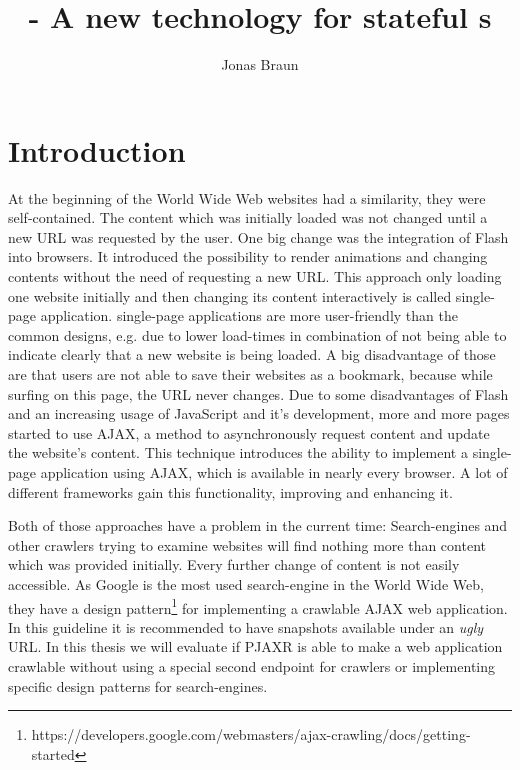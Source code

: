 \documentclass[f,bachelor,binding,twoside,palatino]{WeSTthesis}
\author{Jonas Braun}
\title{\pjaxr{} - A new technology for stateful \singlePageApplication{}s}
\def \ajax {AJAX}
\def \pjaxr {PJAXR}
\def \singlePageApplication {single-page application}
\begin{document}

\maketitle %

\tableofcontents

\varclearpage



\addtocounter{footnote}

\section{Introduction}
    At the beginning of the World Wide Web websites had a similarity, they were self-contained. The content which was initially loaded was not changed until a new URL was requested by the user.
    One big change was the integration of Flash into browsers. It introduced the possibility to render animations and changing contents without the need of requesting a new URL.
    This approach only loading one website initially and then changing its content interactively is called \singlePageApplication{}.
    \singlePageApplication{}s are more user-friendly than the common designs, e.g. due to lower load-times in combination of not being able to indicate clearly that a new website is being loaded.
    A big disadvantage of those are that users are not able to save their websites as a bookmark, because while surfing on this page, the URL never changes.
    Due to some disadvantages of Flash and an increasing usage of JavaScript and it's development, more and more pages started to use \ajax{}, a method to asynchronously request content and update the website's content. This technique introduces the ability to implement a \singlePageApplication{} using \ajax{}, which is available in nearly every browser. A lot of different frameworks gain this functionality, improving and enhancing it.

    Both of those approaches have a problem in the current time: Search-engines and other crawlers trying to examine websites will find nothing more than content which was provided initially. Every further change of content is not easily accessible.
    As Google is the most used search-engine in the World Wide Web, they have a design pattern\footnote{https://developers.google.com/webmasters/ajax-crawling/docs/getting-started} for implementing a crawlable \ajax{} web application. In this guideline it is recommended to have snapshots available under an \emph{ugly} URL.
    In this thesis we will evaluate if \pjaxr{} is able to make a web application crawlable without using a special second endpoint for crawlers or implementing specific design patterns for search-engines.
\end{document}
